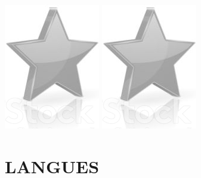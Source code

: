 \documentclass[10pt,a4paper,sans]{article}
\begin{document}
\begin{minipage}[t]{0.28\textwidth}
\begin{mdframed}[style=cadreCompetences]
\begin{itemize}
{                    \includegraphics[scale=0.20]{img/empty_star.png} \hspace{-0.2cm}
                    \includegraphics[scale=0.20]{img/empty_star.png}}
            \end{itemize}

        \section{LANGUES}

\end{mdframed}
\end{minipage}
\end{document}

